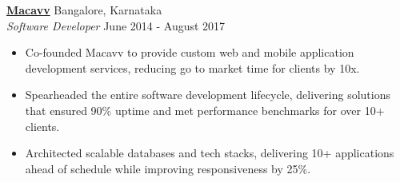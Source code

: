 \textbf{\href{https://www.linkedin.com/company/macavvmedia/}{Macavv}} \hfill Bangalore, Karnataka\\
\textit{Software Developer} \hfill June 2014 - August 2017
\begin{itemize}[leftmargin=*]
  \itemsep0em
  \item Co-founded Macavv to provide custom web and mobile application development services, reducing go to market time for clients by 10x.
  \item Spearheaded the entire software development lifecycle, delivering solutions that ensured 90\% uptime and met performance benchmarks for over 10+ clients.
  \item Architected scalable databases and tech stacks, delivering 10+ applications ahead of schedule while improving responsiveness by 25\%.
\end{itemize}
